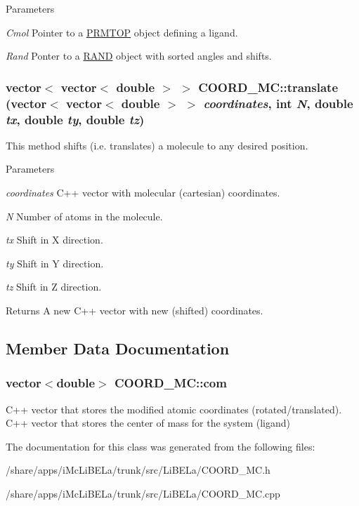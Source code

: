 \begin{DoxyParams}{Parameters}
\item[{\em Cmol}]Pointer to a \hyperlink{classPRMTOP}{PRMTOP} object defining a ligand. \item[{\em Rand}]Ponter to a \hyperlink{classRAND}{RAND} object with sorted angles and shifts. \end{DoxyParams}
\hypertarget{classCOORD__MC_aac39d2abe16a2f0b6015c4e69fb11753}{
\subsubsection[{translate}]{\setlength{\rightskip}{0pt plus 5cm}vector$<$ vector$<$ double $>$ $>$ COORD\_\-MC::translate (vector$<$ vector$<$ double $>$ $>$ {\em coordinates}, \/  int {\em N}, \/  double {\em tx}, \/  double {\em ty}, \/  double {\em tz})}}
\label{classCOORD__MC_aac39d2abe16a2f0b6015c4e69fb11753}
This method shifts (i.e. translates) a molecule to any desired position. 
\begin{DoxyParams}{Parameters}
\item[{\em coordinates}]C++ vector with molecular (cartesian) coordinates. \item[{\em N}]Number of atoms in the molecule. \item[{\em tx}]Shift in X direction. \item[{\em ty}]Shift in Y direction. \item[{\em tz}]Shift in Z direction. \end{DoxyParams}
\begin{DoxyReturn}{Returns}
A new C++ vector with new (shifted) coordinates. 
\end{DoxyReturn}


\subsection{Member Data Documentation}
\hypertarget{classCOORD__MC_adf957d739f01ee5eb6fa85cbbb106c18}{
\subsubsection[{com}]{\setlength{\rightskip}{0pt plus 5cm}vector$<$double$>$ {\bf COORD\_\-MC::com}}}
\label{classCOORD__MC_adf957d739f01ee5eb6fa85cbbb106c18}


C++ vector that stores the modified atomic coordinates (rotated/translated). C++ vector that stores the center of mass for the system (ligand) 

The documentation for this class was generated from the following files:\begin{DoxyCompactItemize}
\item 
/share/apps/iMcLiBELa/trunk/src/LiBELa/COORD\_\-MC.h\item 
/share/apps/iMcLiBELa/trunk/src/LiBELa/COORD\_\-MC.cpp\end{DoxyCompactItemize}
